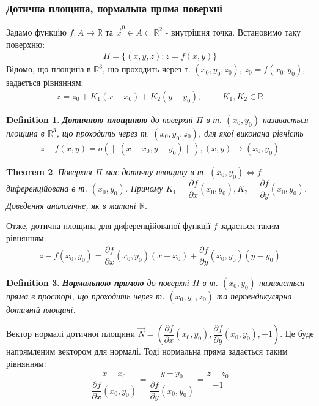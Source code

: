 \documentclass[a4paper, 10pt]{article}
\def\departial#1#2{\dfrac{\partial {#1}}{\partial {#2}}}
\theoremstyle{theoremdd}
\newtheorem{theorem}{Theorem}[subsection]
\theoremstyle{theoremdd}
\theoremstyle{theoremdd}
\newtheorem{definition}[theorem]{Definition}
\theoremstyle{theoremdd}
\theoremstyle{theoremdd}
\theoremstyle{theoremdd}
\theoremstyle{theoremdd}
\theoremstyle{theoremdd}
\theoremstyle{theoremdd}
\newcommand\Norm[1]{\lVert#1\rVert}
\begin{document}
\subsubsection{Дотична площина, нормальна пряма поверхні}
Задамо функцію $f: A \to \mathbb{R}$ та $\vec{x}^0 \in A \subset \mathbb{R}^2$ - внутрішня точка. Встановимо таку поверхню:
\begin{align*}
\Pi = \{(x,y,z): z = f(x,y) \}
\end{align*}
Відомо, що площина в $\mathbb{R}^{3}$, що проходить через т. $(x_0, y_0, z_0)$, $z_0 = f(x_0,y_0)$, задається рівнянням:
\begin{align*}
z = z_0 + K_1(x-x_0) + K_2(y-y_0), \hspace{1cm} K_1,K_2 \in \mathbb{R}
\end{align*}

\begin{definition}
\textbf{Дотичною площиною} до поверхні $\Pi$ в т. $(x_0,y_0)$ називається площина в $\mathbb{R}^{3}$, що проходить через т. $(x_0,y_0,z_0)$, для якої виконана рівність
\begin{align*}
z - f(x,y) = o(\Norm{(x-x_0,y-y_0)}), (x,y) \to (x_0,y_0)
\end{align*}
\end{definition}

\begin{theorem}
Поверхня $\Pi$ має дотичну площину в т. $(x_0,y_0) \iff f$ - диференційована в т. $(x_0,y_0)$. Причому $K_1 = \departial{f}{x}(x_0,y_0),K_2 = \departial{f}{y}(x_0,y_0)$.\\
\textit{Доведення аналогічне, як в матані $\mathbb{R}$.}
\end{theorem}

Отже, дотична площина для диференційованої функції $f$ задається таким рівнянням:
\begin{align*}
z - f(x_0,y_0) = \departial{f}{x}(x_0,y_0) (x-x_0) + \departial{f}{y}(x_0,y_0) (y-y_0)
\end{align*}

\begin{definition}
\textbf{Нормальною прямою} до поверхні $\Pi$ в т. $(x_0,y_0)$ називається пряма в просторі, що проходить через т. $(x_0,y_0,z_0)$ та перпендикулярна дотичній площині.
\end{definition}

Вектор нормалі дотичної площини $\vec{N} = \left( \departial{f}{x}(x_0,y_0), \departial{f}{y}(x_0,y_0), -1 \right)$. Це буде напрямленим вектором для нормалі. Тоді нормальна пряма задається таким рівнянням:
\begin{align*}
\dfrac{x-x_0}{\departial{f}{x}(x_0,y_0)} = \dfrac{y-y_0}{\departial{f}{y}(x_0,y_0)} = \dfrac{z-z_0}{-1}
\end{align*}
\end{document}
